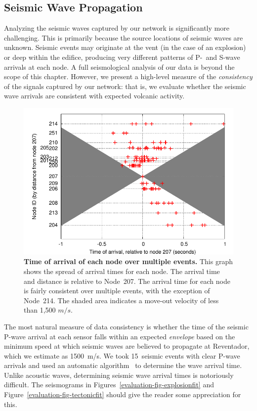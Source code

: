 \subsection{Seismic Wave Propagation}

Analyzing the seismic waves captured by our network is significantly more
challenging. This is primarily because the source locations of seismic waves
are unknown. Seismic events may originate at the vent (in the case of an
explosion) or deep within the edifice, producing very different patterns of
P-~and S-wave arrivals at each node. A full seismological analysis of our
data is beyond the scope of this chapter. However, we present a high-level
measure of the \textit{consistency} of the signals captured by our network:
that is, we evaluate whether the seismic wave arrivals are consistent with
expected volcanic activity.

\begin{figure}[t]
\begin{center}
\includegraphics[width=0.8\hsize]{./3-evaluation/figs/arrivaltimes.pdf}
\end{center}

\caption{\textbf{Time of arrival of each node over multiple events.} This
graph shows the spread of arrival times for each node. The arrival time and
distance is relative to Node~207. The arrival time for each node is fairly
consistent over multiple events, with the exception of Node~214.  The shaded
area indicates a move-out velocity of less than 1,500 $m/s$.}

\label{evaluation-fig-arrivaltimes}
\end{figure}

The most natural measure of data consistency is whether the time of the
seismic P-wave arrival at each sensor falls within an expected
\textit{envelope} based on the minimum speed at which seismic waves are
believed to propagate at Reventador, which we estimate as 1500~m/s. We took
15~seismic events with clear P-wave arrivals and used an automatic
algorithm~\cite{pwave-picking} to determine the wave arrival time. Unlike
acoustic waves, determining seismic wave arrival times is notoriously
difficult. The seismograms in Figures~\ref{evaluation-fig-explosionfit} and
Figure~\ref{evaluation-fig-tectonicfit} should give the reader some
appreciation for this.

